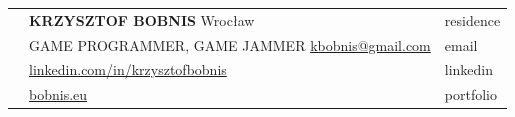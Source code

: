 \documentclass[12pt,a4paper]{article}
\begin{document}
\begin{tabular}  { >{\RaggedLeft}p{0cm} p{15.5cm}  p{2cm} }  
	& {\Large \textbf{KRZYSZTOF BOBNIS}} \hfill Wrocław & \textcolor{techColor}{residence} \\
	& GAME PROGRAMMER, GAME JAMMER \hfill  {\href{mailto:kbobnis@gmail.com}{kbobnis@gmail.com}} & \textcolor{techColor}{email} \\ 
	& \hfill {\href{https://www.linkedin.com/in/krzysztofbobnis}{linkedin.com/in/krzysztofbobnis}} & \textcolor{techColor}{linkedin} \\
	& \hfill {\href{http://bobnis.eu}{bobnis.eu}} & \textcolor{techColor}{portfolio} \\
\end{tabular}	 

\vspace{0.0cm}

\centering


\vspace*{0.5cm}
\end{document}
